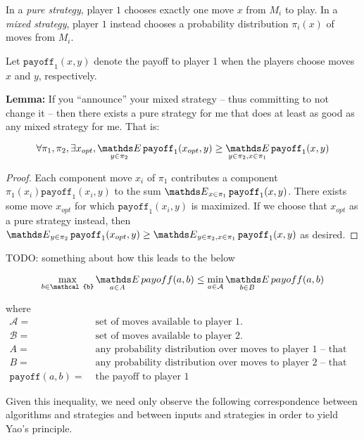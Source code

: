In a \emph{pure strategy}, player $1$ chooses exactly one move $x$ from $M_i$ to play. In a \emph{mixed strategy}, player $1$ instead chooses a probability distribution $\pi_i(x)$ of moves from $M_i$.

Let $\texttt{payoff}_1(x, y)$ denote the payoff to player 1 when the players choose moves $x$ and $y$, respectively.

\textbf{Lemma:} If you ``announce'' your mixed strategy -- thus committing to not change it -- then there exists a pure strategy for me that does at least as good as any mixed strategy for me. That is:

$$\forall \pi_1, \pi_2, \exists x_{opt}, \Expected_{y \in \pi_2} \texttt{payoff}_1(x_{opt}, y) \geq \Expected_{y \in \pi_2, x \in \pi_1} \texttt{payoff}_1(x, y)$$

\begin{proof}

Each component move $x_i$ of $\pi_1$ contributes a component $\pi_1(x_i) \texttt{payoff}_1(x_i, y)$ to the sum $\Expected_{x \in \pi_1} \texttt{payoff}_1(x, y)$. There exists some move $x_{opt}$ for which $\texttt{payoff}_1(x_i, y)$ is maximized. If we choose that $x_{opt}$ as a pure strategy instead, then $\Expected_{y \in \pi_2} \texttt{payoff}_1(x_{opt}, y) \geq \Expected_{y \in \pi_2, x \in \pi_1} \texttt{payoff}_1(x, y)$ as desired.

\end{proof}

TODO: something about how this leads to the below

$$\max_{b \in \mathcal{b}} \Expected_{a \in A} payoff(a, b) \leq \min_{a \in \mathcal{A}} \Expected_{b \in B} payoff(a, b)$$

where \begin{align*}
\mathcal{A} =&\; \text{set of moves available to player 1.}
\\
\mathcal{B} =&\; \text{set of moves available to player 2.}
\\
A =&\; \text{any probability distribution over moves to player 1 -- that is, any mixed strategy for player 1.}
\\
B =&\; \text{any probability distribution over moves to player 2 -- that is, any mixed strategy for player 2.}
\\
\texttt{payoff}(a, b) =&\; \text{the payoff to player 1}
\end{align*}

Given this inequality, we need only observe the following correspondence between algorithms and strategies and between inputs and strategies in order to yield Yao's principle.

